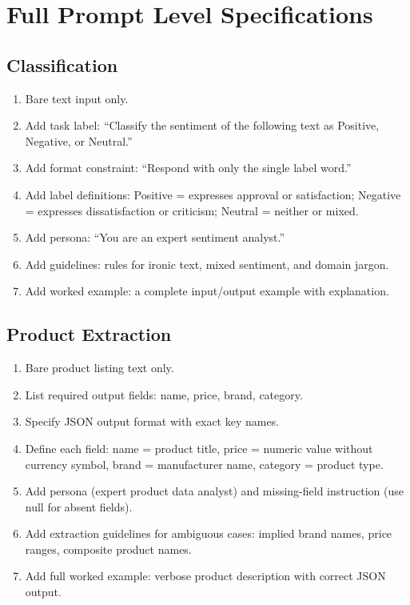 \section{Full Prompt Level Specifications}
\label{app:prompts}

\subsection{Classification}
\begin{enumerate}
  \item Bare text input only.
  \item Add task label: ``Classify the sentiment of the following text as
    Positive, Negative, or Neutral.''
  \item Add format constraint: ``Respond with only the single label word.''
  \item Add label definitions: Positive = expresses approval or satisfaction;
    Negative = expresses dissatisfaction or criticism; Neutral = neither or mixed.
  \item Add persona: ``You are an expert sentiment analyst.''
  \item Add guidelines: rules for ironic text, mixed sentiment, and domain jargon.
  \item Add worked example: a complete input/output example with explanation.
\end{enumerate}

\subsection{Product Extraction}
\begin{enumerate}
  \item Bare product listing text only.
  \item List required output fields: name, price, brand, category.
  \item Specify JSON output format with exact key names.
  \item Define each field: name = product title, price = numeric value without
    currency symbol, brand = manufacturer name, category = product type.
  \item Add persona (expert product data analyst) and missing-field instruction
    (use null for absent fields).
  \item Add extraction guidelines for ambiguous cases: implied brand names,
    price ranges, composite product names.
  \item Add full worked example: verbose product description with correct JSON output.
\end{enumerate}


